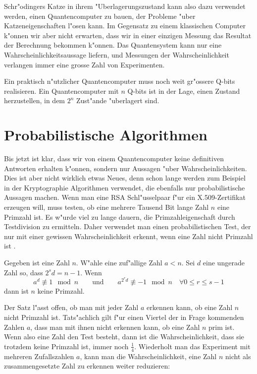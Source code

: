 Schr"odingers Katze in ihrem "Uberlagerungszustand kann also dazu
verwendet werden, einen Quantencomputer zu bauen, der Probleme "uber
Katzeneigenschaften l"osen kann.
Im Gegensatz zu einem klassischen Computer k"onnen wir aber nicht
erwarten, dass wir in einer einzigen Messung das Resultat der
Berechnung bekommen k"onnen.
Das Quantensystem kann nur eine Wahrscheinlichkeitsaussage liefern,
und Messungen der Wahrscheinlichkeit verlangen immer eine grosse Zahl
von Experimenten.

Ein praktisch n"utzlicher Quantencomputer muss noch weit gr"ossere
Q-bits realisieren.
Ein Quantencomputer mit $n$ Q-bits ist in der Lage, einen Zustand
herzustellen, in dem $2^n$ Zust"ande "uberlagert sind. 

\section{Probabilistische Algorithmen}
Bis jetzt ist klar, dass wir von einem Quantencomputer keine definitiven
Antworten erhalten k"onnen, sondern nur Aussagen "uber Wahrscheinlichkeiten.
Dies ist aber nicht wirklich etwas Neues, denn schon lange werden
zum Beispiel in der Kryptographie Algorithmen verwendet, die ebenfalls
nur probabilistische Aussagen machen.
Wenn man eine RSA Schl"usselpaar f"ur ein X.509-Zertifikat erzeugen will,
muss testen, ob eine mehrere Tausend Bit lange Zahl $n$ eine Primzahl ist.
Es w"urde viel zu lange dauern, die Primzahleigenschaft durch Testdivision 
zu ermitteln.
Daher verwendet man einen probabilistischen Test, der nur mit einer
gewissen Wahrscheinlichkeit erkennt, wenn eine Zahl nicht Primzahl ist
\cite{skript:miller-rabin}.

\begin{satz}
\label{skript:quantencomputer:miller-rabin-kriterium}
Gegeben ist eine Zahl $n$. W"ahle eine zuf"allige Zahl $a<n$. Sei $d$
eine ungerade Zahl so, dass $2^sd=n-1$. Wenn 
\[
a^d\not\equiv 1\mod n
\qquad\text{und}\qquad
a^{2^rd}\not\equiv -1\mod n\quad\forall 0\le r\le s-1
\]
dann ist $n$ keine Primzahl.
\end{satz}

Der Satz l"asst offen, ob man mit jeder Zahl $a$ erkennen kann, ob
eine Zahl $n$ nicht Primzahl ist.
Tats"achlich gilt f"ur einen Viertel der in Frage kommenden Zahlen
$a$, dass man mit ihnen nicht erkennen kann, ob eine Zahl $n$ prim ist.
Wenn also eine Zahl den Test besteht, dann ist die Wahrscheinlichkeit,
dass sie trotzdem keine Primzahl ist, immer noch $\frac14$. Wiederholt
man das Experiment mit mehreren Zufallszahlen $a$, kann man die
Wahrscheinlichkeit, eine Zahl $n$ nicht als zusammengesetzte Zahl zu
erkennen weiter reduzieren:


